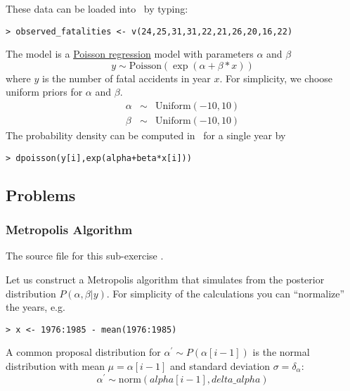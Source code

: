 These data can be loaded into \RevBayes~by typing:
{\tt \begin{snugshade*}
\begin{lstlisting}    
> observed_fatalities <- v(24,25,31,31,22,21,26,20,16,22)
\end{lstlisting}
\end{snugshade*}}

The model is a \href{http://en.wikipedia.org/wiki/Poisson_regression}{Poisson regression} model with parameters $\alpha$ and $\beta$
\begin{equation*}
y \sim \text{Poisson}(\exp(\alpha+\beta*x))
\end{equation*} 
where $y$ is the number of fatal accidents in year $x$. 
For simplicity, we choose uniform priors for $\alpha$ and $\beta$.
\begin{eqnarray*}
\alpha & \sim & \text{Uniform}(-10,10)\\
\beta &  \sim & \text{Uniform}(-10,10)
\end{eqnarray*}
The probability density can be computed in \RevBayes~for a single year by
{\tt \begin{snugshade*}
\begin{lstlisting}    
> dpoisson(y[i],exp(alpha+beta*x[i]))
\end{lstlisting}
\end{snugshade*}}

\subsection*{Problems}

\subsubsection*{Metropolis Algorithm}%

The source file for this sub-exercise .

Let us construct a Metropolis algorithm that simulates from the posterior distribution $P(\alpha,\beta|y)$. 
For simplicity of the calculations you can ``normalize'' the years, e.g. 
{\tt \begin{snugshade*}
\begin{lstlisting}    
> x <- 1976:1985 - mean(1976:1985)
\end{lstlisting}
\end{snugshade*}}

A common proposal distribution for $\alpha^{\prime} \sim P(\alpha[i-1])$ is the normal distribution with mean $\mu = \alpha[i-1]$ and standard deviation $\sigma = \delta_\alpha$:
\begin{equation}
\alpha^{\prime} \sim \text{norm}(alpha[i-1],delta\_alpha)
\end{equation}

